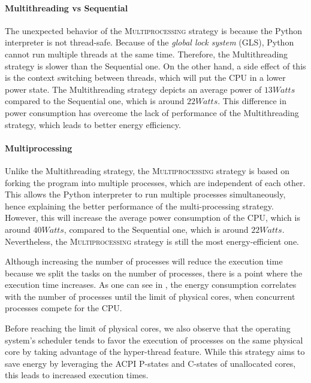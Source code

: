 \paragraph*{Multithreading vs Sequential}
The unexpected behavior of the \textsc{Multiprocessing} strategy is because the Python interpreter is not thread-safe.
Because of the \emph{global lock system} (GLS), Python cannot run multiple threads at the same time.
Therefore, the \textsf{Multithreading} strategy is slower than the \textsf{Sequential} one.
On the other hand, a side effect of this is the context switching between threads, which will put the CPU in a lower power state.
The \textsf{Multithreading} strategy depicts an average power of $13 Watts$ compared to the \textsf{Sequential} one, which is around $22 Watts$.
This difference in power consumption has overcome the lack of performance of the \textsf{Multithreading} strategy, which leads to better energy efficiency.


\paragraph*{Multiprocessing}
Unlike the \textsf{Multithreading} strategy, the \textsc{Multiprocessing} strategy is based on forking the program into multiple processes, which are independent of each other. 
This allows the Python interpreter to run multiple processes simultaneously, hence explaining the better performance of the multi-processing strategy.
However, this will increase the average power consumption of the CPU, which is around $40 Watts$, compared to the \textsf{Sequential} one, which is around $22 Watts$.
Nevertheless, the \textsc{Multiprocessing} strategy is still the most energy-efficient one.

Although increasing the number of processes will reduce the execution time because we split the tasks on the number of processes, there is a point where the execution time increases.
As one can see in , the energy consumption correlates with the number of processes until the limit of physical cores, when concurrent processes compete for the CPU.

Before reaching the limit of physical cores, we also observe that the operating system's scheduler tends to favor the execution of processes on the same physical core by taking advantage of the hyper-thread feature.
While this strategy aims to save energy by leveraging the ACPI P-states and C-states of unallocated cores, this leads to increased execution times.

